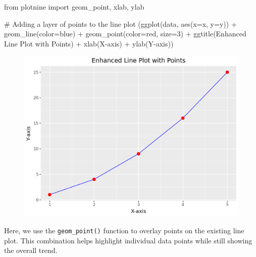 \documentclass[
  letterpaper,
  DIV=11,
  numbers=noendperiod]{scrreprt}
\newenvironment{Shaded}{\begin{snugshade}}{\end{snugshade}}
\newcommand{\CommentTok}[1]{\textcolor[rgb]{0.37,0.37,0.37}{#1}}
\newcommand{\DecValTok}[1]{\textcolor[rgb]{0.68,0.00,0.00}{#1}}
\newcommand{\ImportTok}[1]{\textcolor[rgb]{0.00,0.46,0.62}{#1}}
\newcommand{\NormalTok}[1]{\textcolor[rgb]{0.00,0.23,0.31}{#1}}
\newcommand{\OperatorTok}[1]{\textcolor[rgb]{0.37,0.37,0.37}{#1}}
\newcommand{\StringTok}[1]{\textcolor[rgb]{0.13,0.47,0.30}{#1}}
\begin{document}
\begin{Shaded}
\begin{Highlighting}[]
\ImportTok{from}\NormalTok{ plotnine }\ImportTok{import}\NormalTok{ geom\_point, xlab, ylab}

\CommentTok{\# Adding a layer of points to the line plot}
\NormalTok{(ggplot(data, aes(x}\OperatorTok{=}\StringTok{\textquotesingle{}x\textquotesingle{}}\NormalTok{, y}\OperatorTok{=}\StringTok{\textquotesingle{}y\textquotesingle{}}\NormalTok{)) }\OperatorTok{+}
\NormalTok{ geom\_line(color}\OperatorTok{=}\StringTok{\textquotesingle{}blue\textquotesingle{}}\NormalTok{) }\OperatorTok{+}
\NormalTok{ geom\_point(color}\OperatorTok{=}\StringTok{\textquotesingle{}red\textquotesingle{}}\NormalTok{, size}\OperatorTok{=}\DecValTok{3}\NormalTok{) }\OperatorTok{+}
\NormalTok{ ggtitle(}\StringTok{\textquotesingle{}Enhanced Line Plot with Points\textquotesingle{}}\NormalTok{) }\OperatorTok{+}
\NormalTok{ xlab(}\StringTok{\textquotesingle{}X{-}axis\textquotesingle{}}\NormalTok{) }\OperatorTok{+}
\NormalTok{ ylab(}\StringTok{\textquotesingle{}Y{-}axis\textquotesingle{}}\NormalTok{))}
\end{Highlighting}
\end{Shaded}

\begin{figure}[H]

{\centering \includegraphics{15_Data_Vis_files/figure-pdf/cell-20-output-1.png}

}

\end{figure}

Here, we use the \texttt{geom\_point()} function to overlay points on
the existing line plot. This combination helps highlight individual data
points while still showing the overall trend.
\end{document}
